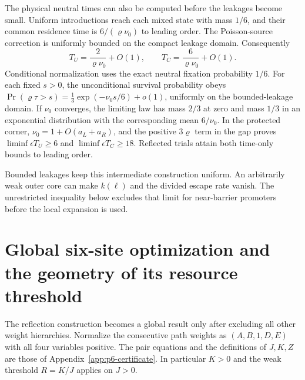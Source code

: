\documentclass[aps,pre,reprint,amsmath,amssymb,longbibliography]{revtex4-2}
\begin{document}
The physical neutral times can also be computed before the
leakages become small. Uniform introductions reach each mixed state
with mass $1/6$, and their common residence time is
$6/(\varrho \nu_0)$ to leading order. The Poisson-source correction
is uniformly bounded on the compact leakage domain. Consequently
\begin{equation}
 T_U=\frac{2}{\varrho \nu_0}+O(1),\qquad
 T_C=\frac{6}{\varrho \nu_0}+O(1).
 \label{eq:asym-times-v2}
\end{equation}
Conditional normalization uses the exact neutral fixation
probability $1/6$. For each fixed $s>0$, the unconditional survival
probability obeys
$\Pr(\varrho\tau>s)=\frac13\exp(-\nu_0s/6)+o(1)$,
uniformly on the bounded-leakage domain. If $\nu_0$ converges, the
limiting law has mass $2/3$ at zero and mass $1/3$ in an
exponential distribution with the corresponding mean $6/\nu_0$.
In the protected corner,
$\nu_0=1+O(a_L+a_R)$, and the positive $3\varrho$ term in the gap
proves $\liminf\epsilon T_U\ge6$ and
$\liminf\epsilon T_C\ge18$. Reflected trials attain both time-only
bounds to leading order.

Bounded leakages keep this intermediate construction uniform. An
arbitrarily weak outer core can make $k(\ell)$ and the divided escape
rate vanish. The unrestricted inequality below excludes that limit
for near-barrier promoters before the local expansion is used.

\section{Global six-site optimization and the geometry of its resource threshold}
\label{v3-app-global-p6}

The reflection construction becomes a global result only after excluding
all other weight hierarchies. Normalize the consecutive path weights as
$(A,B,1,D,E)$ with all four variables positive. The pair equations and the
definitions of $J,K,Z$ are those of Appendix~\ref{app:p6-certificate}.
In particular $K>0$ and the weak threshold $R=K/J$ applies on $J>0$.
\end{document}
